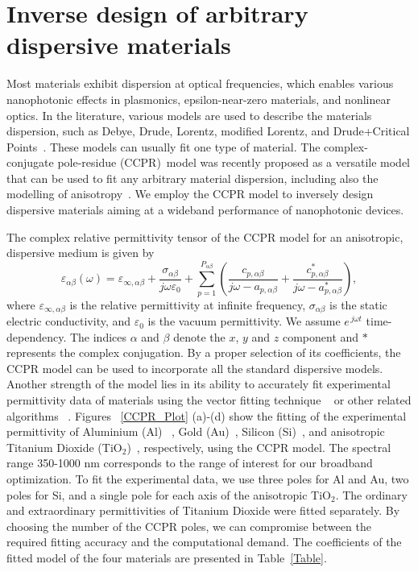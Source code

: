\documentclass[aps,prl,twocolumn,superscriptaddress,longbibliography]{revtex4-1}
\begin{document}
\section{Inverse design of arbitrary dispersive materials }\label{Sec:1}
Most materials exhibit dispersion at optical frequencies, which enables various nanophotonic effects in plasmonics, epsilon-near-zero materials, and nonlinear optics. In the literature, various models are used to describe the materials dispersion, such as Debye, Drude, Lorentz, modified Lorentz, and Drude+Critical Points~\cite{material}.
These models can usually fit one type of material. %
The complex-conjugate pole-residue (CCPR)~model was recently proposed as a versatile model that can be used to fit any arbitrary material dispersion, including also the modelling of anisotropy~\cite{material}. 
We employ the CCPR model to inversely design dispersive materials aiming at a wideband performance of nanophotonic devices.

The complex relative permittivity tensor of the CCPR model for an anisotropic, dispersive medium is given by \cite{material}
\begin{equation}\label{Eq:CCPRModel}
\varepsilon_{\alpha \beta}(\omega)\!=\!\varepsilon_{\infty, \alpha \beta}+\frac{\sigma_{\alpha \beta}}{j \omega \varepsilon_0}+\sum_{p=1}^{P_{\alpha \beta}}\left(\frac{c_{p, \alpha \beta}}{j \omega-a_{p, \alpha \beta}}+\frac{c_{p, \alpha \beta}^*}{j \omega-a_{p, \alpha \beta}^*}\right)\!,
\end{equation}
where $\varepsilon_{\infty, \alpha \beta}$ is the relative permittivity at infinite frequency,  $\sigma_{\alpha \beta}$ is the static electric conductivity, and $\varepsilon_0$ is the vacuum permittivity. We assume $e^{\,j\omega t}$ time-dependency.
The indices $\alpha$ and $\beta$ denote the $x$, $y$ and $z$ component and $*$ represents the complex conjugation.
By a proper selection of its coefficients, the CCPR model can be used to incorporate all the standard dispersive models. 
Another strength of the model lies in its ability to accurately fit experimental permittivity data of materials using the vector fitting technique ~\cite{vectorFitting1, vectorFitting2} or
other related algorithms ~\cite{vectorFittingAlternative}.
Figures ~\ref{CCPR_Plot} (a)-(d) show the fitting of the experimental permittivity of Aluminium (Al) ~\cite{Rakic:95}, Gold (Au)~\cite{ Au_Johnson}, Silicon (Si)~\cite{Si_Schinke}, and  anisotropic Titanium Dioxide (TiO$_{\mathrm{2}}$)~\cite{DeVore:51}, respectively, using the CCPR model.
The spectral range 350-1000 nm corresponds to the range of interest for our broadband optimization. 
To fit the experimental data, we use three poles for Al and Au, two poles for Si, and a single pole for each axis of the anisotropic TiO$_{\mathrm{2}}$. The ordinary and extraordinary permittivities of Titanium Dioxide were fitted separately.
By choosing the number of the CCPR poles, we can compromise between the required fitting accuracy and the computational demand. The coefficients of the fitted model of the four materials are presented in Table~\ref{Table}.
\end{document}
